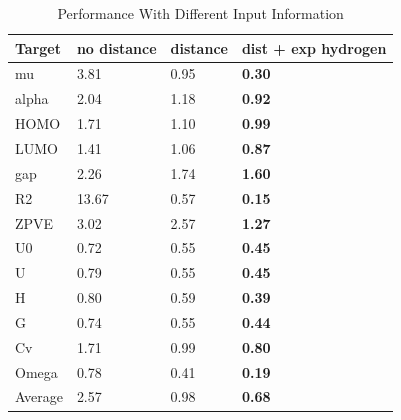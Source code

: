 \documentclass{article}
\begin{document}
\begin{table}[t]
\centering
\caption{Performance With Different Input Information}
\label{tb:input}
\begin{tabular}{llll}
\hline
Target  & no distance & distance & dist + exp hydrogen \\
\hline
mu      & 3.81        & 0.95     & \textbf{0.30}                \\
alpha   & 2.04        & 1.18     & \textbf{0.92}                \\
HOMO    & 1.71        & 1.10     & \textbf{0.99}                \\
LUMO    & 1.41        & 1.06     & \textbf{0.87}                \\
gap     & 2.26        & 1.74     & \textbf{1.60}                \\
R2      & 13.67       & 0.57     & \textbf{0.15}                \\
ZPVE    & 3.02        & 2.57     & \textbf{1.27}                \\
U0      & 0.72        & 0.55     & \textbf{0.45}                \\
U       & 0.79        & 0.55     & \textbf{0.45}                \\
H       & 0.80        & 0.59     & \textbf{0.39}                \\
G       & 0.74        & 0.55     & \textbf{0.44}                \\
Cv      & 1.71        & 0.99     & \textbf{0.80}                \\
Omega   & 0.78        & 0.41     & \textbf{0.19}                \\
\hline
Average & 2.57        & 0.98     & \textbf{0.68}               
\end{tabular}
\end{table}
\end{document}

